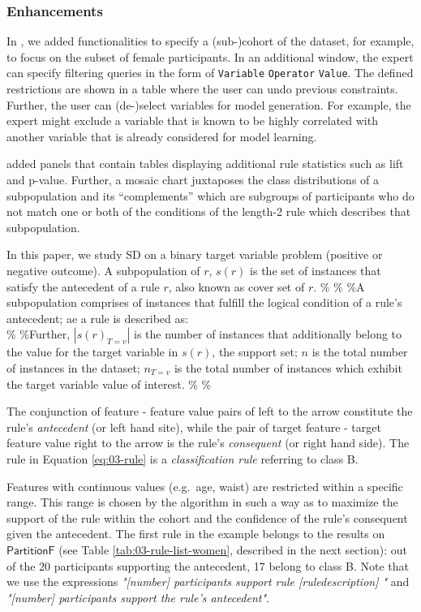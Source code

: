 \documentclass[
  oneside]{book}
\begin{document}
\hypertarget{enhancements}{%
\subsubsection{Enhancements}\label{enhancements}}

In \autocite{Niemann:IMM2014}, we added functionalities to specify a (sub-)cohort of the dataset, for example, to focus on the subset of female participants.
In an additional window, the expert can specify filtering queries in the form of \texttt{Variable} \texttt{Operator} \texttt{Value}.
The defined restrictions are shown in a table where the user can undo previous constraints.
Further, the user can (de-)select variables for model generation.
For example, the expert might exclude a variable that is known to be highly correlated with another variable that is already considered for model learning.

\autocite{Schleicher:CBMS17} added panels that contain tables displaying additional rule statistics such as lift and p-value.
Further, a mosaic chart juxtaposes the class distributions of a subpopulation and its ``complements'' which are subgroups of participants who do not match one or both of the conditions of the length-2 rule which describes that subpopulation.

In this paper, we study SD on a binary target variable problem (positive or negative outcome). A subpopulation of \(r\), \(s(r)\) is the set of instances that satisfy the antecedent of a rule \(r\), also known as cover set of \(r\). \% \%
\%A subpopulation comprises of instances that fulfill the logical condition of a rule's antecedent; ae a rule is described as:\\
\%
\%Further, \(|s(r)_{T=v}|\) is the number of instances that additionally belong to the value for the target variable in \(s(r)\), the support set; \(n\) is the total number of instances in the dataset; \(n_{T=v}\) is the total number of instances which exhibit the target variable value of interest. \%
\%

The conjunction of feature - feature value pairs of left to the arrow constitute the rule's \emph{antecedent} (or left hand site), while the pair of target feature - target feature value right to the arrow is the rule's \emph{consequent} (or right hand side).
The rule in Equation \eqref{eq:03-rule} is a \emph{classification rule} referring to class B.

Features with continuous values (e.g.~age, waist) are restricted within a specific range.
This range is chosen by the algorithm in such a way as to maximize the support of the rule within the cohort and the confidence of the rule's consequent given the antecedent. The first rule in the example belongs to the results on \(\mathsf{PartitionF}\) (see Table \ref{tab:03-rule-list-women}, described in the next section): out of the 20 participants supporting the antecedent, 17 belong to class B.
Note that we use the expressions \emph{"[number] participants support rule [ruledescription] "} and \emph{"[number] participants support the rule's \emph{antecedent}"}.
\end{document}
